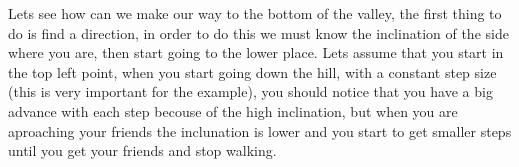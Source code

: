 \documentclass[12pt,journal]{IEEEtran}
\begin{document}
    \begin{figure}[h]
        \centering
    \end{figure}

    Lets see how can we make our way to the bottom of the valley, the first
    thing to do is find a direction, in order to do this we must know the
    inclination of the side where you are, then start going to the lower place.
    Lets assume that you start in the top left point, when you start going down
    the hill, with a constant step size (this is very important for the
    example), you should notice that you have a big advance with each step
    becouse of the high inclination, but when you are aproaching your friends
    the inclunation is lower and you start to get smaller steps until you get
    your friends and stop walking.

    \newpage
\end{document}
